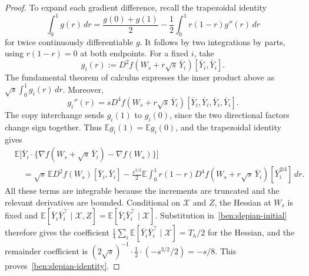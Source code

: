 \documentclass[11pt,letterpaper]{article}
\theoremstyle{remark}
\newcommand{\E}{\mathbb E}
\begin{document}
\begin{proof}
To expand each gradient difference, recall the trapezoidal identity
\[
 \int_0^1g(r)\,dr
 =\frac{g(0)+g(1)}2-\frac12\int_0^1r(1-r)g''(r)\,dr
\]
for twice continuously differentiable $g$. It follows by two
integrations by parts, using $r(1-r)=0$ at both endpoints.
For a fixed $i$, take
\[
 g_i(r):=D^2f(W_s+r\sqrt s\,\bar Y_i)[\bar Y_i,\bar Y_i].
\]
The fundamental theorem of calculus expresses the inner product
above as $\sqrt s\int_0^1g_i(r)\,dr$.
Moreover,
\[
 g_i''(r)=sD^4f(W_s+r\sqrt s\,\bar Y_i)
                   [\bar Y_i,\bar Y_i,\bar Y_i,\bar Y_i].
\]
The copy interchange sends $g_i(1)$ to $g_i(0)$, since the two
directional factors change sign together. Thus
$\E g_i(1)=\E g_i(0)$, and the trapezoidal identity gives
\begin{align*}
 &\E\big[\bar Y_i\cdot
   \{\nabla f(W_s+\sqrt s\,\bar Y_i)-\nabla f(W_s)\}\big]\\
 &\quad=\sqrt s\,\E D^2f(W_s)[\bar Y_i,\bar Y_i]
 -\frac{s^{3/2}}2\E\int_0^1r(1-r)
       D^4f(W_s+r\sqrt s\,\bar Y_i)[\bar Y_i^{\otimes4}]\,dr.
\end{align*}
All these terms are integrable because the increments are truncated
and the relevant derivatives are bounded. Conditional on
$\mathcal X$ and $Z$, the Hessian at $W_s$ is fixed and
$\E[\bar Y_i\bar Y_i^\top\mid\mathcal X,Z]
=\E[\bar Y_i\bar Y_i^\top\mid\mathcal X]$.
Substitution in~\eqref{ben:slepian-initial} therefore gives the
coefficient $\tfrac14\sum_i\E[\bar Y_i\bar Y_i^\top\mid\mathcal X]
=T_h/2$ for the Hessian, and the remainder coefficient is
$(2\sqrt s)^{-1}\cdot\tfrac12\cdot(-s^{3/2}/2)=-s/8$.
This proves~\eqref{ben:slepian-identity}.
\end{proof}
\end{document}
